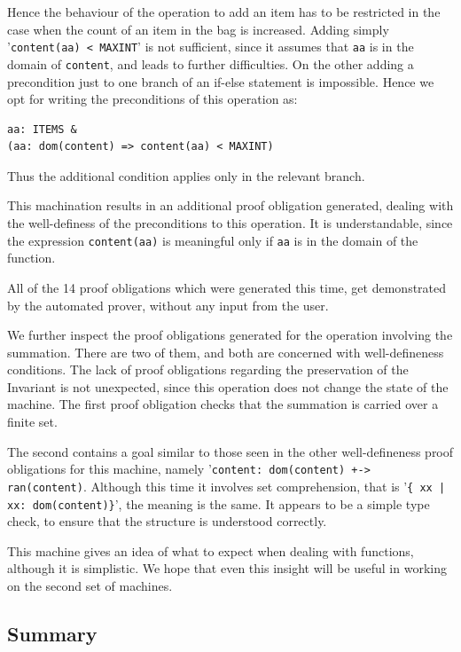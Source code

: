 \documentclass[12pt,journal,duplex]{IEEEtran}
\begin{document}
	Hence the behaviour of the operation to add an item has to be restricted in the case when the count of an item in the bag is increased. Adding simply '\texttt{content(aa) < MAXINT}' is not sufficient, since it assumes that \texttt{aa} is in the domain of \texttt{content}, and leads to further difficulties. On the other adding a precondition just to one branch of an if-else statement is impossible. Hence we opt for writing the preconditions of this operation as:
	\begin{lstlisting}
aa: ITEMS &
(aa: dom(content) => content(aa) < MAXINT)
	\end{lstlisting}
	Thus the additional condition applies only in the relevant branch.

	This machination results in an additional proof obligation generated, dealing with the well-definess of the preconditions to this operation. It is understandable, since the expression \texttt{content(aa)} is meaningful only if \texttt{aa} is in the domain of the function.

	All of the 14 proof obligations which were generated this time, get demonstrated by the automated prover, without any input from the user.

	We further inspect the proof obligations generated for the operation involving the summation. There are two of them, and both are concerned with well-defineness conditions. The lack of proof obligations regarding the preservation of the Invariant is not unexpected, since this operation does not change the state of the machine. The first proof obligation checks that the summation is carried over a finite set.

	The second contains a goal similar to those seen in the other well-defineness proof obligations for this machine, namely '\texttt{content: dom(content) +-> ran(content)}. Although this time it involves set comprehension, that is '\texttt{\{~xx | xx: dom(content)\}}', the meaning is the same. It appears to be a simple type check, to ensure that the structure is understood correctly.

	This machine gives an idea of what to expect when dealing with functions, although it is simplistic. We hope that even this insight will be useful in working on the second set of machines.

	\subsection{Summary}
\end{document}
